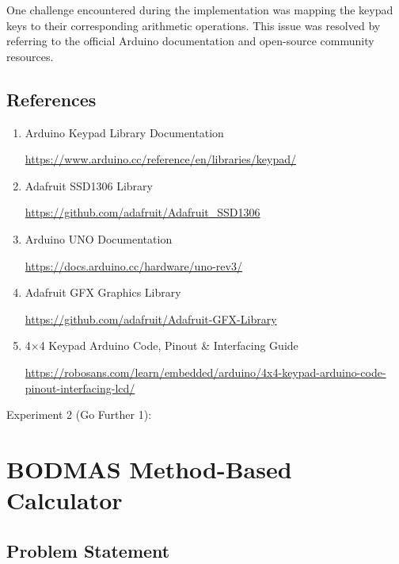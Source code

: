 One challenge encountered during the implementation was mapping the keypad keys to their corresponding arithmetic operations. This issue was resolved by referring to the official Arduino documentation and open-source community resources.


\subsection{References}

\begin{enumerate}

\item Arduino Keypad Library Documentation

\url{https://www.arduino.cc/reference/en/libraries/keypad/}

\item Adafruit SSD1306 Library

\url{https://github.com/adafruit/Adafruit_SSD1306}

\item Arduino UNO Documentation

\url{https://docs.arduino.cc/hardware/uno-rev3/}

\item Adafruit GFX Graphics Library

\url{https://github.com/adafruit/Adafruit-GFX-Library}

\item 4×4 Keypad Arduino Code, Pinout \& Interfacing Guide

\url{https://robosans.com/learn/embedded/arduino/4x4-keypad-arduino-code-pinout-interfacing-lcd/}

\end{enumerate}

\clearpage


\clearpage
Experiment 2 (Go Further 1):
\section{BODMAS Method-Based Calculator}


\subsection{Problem Statement}

